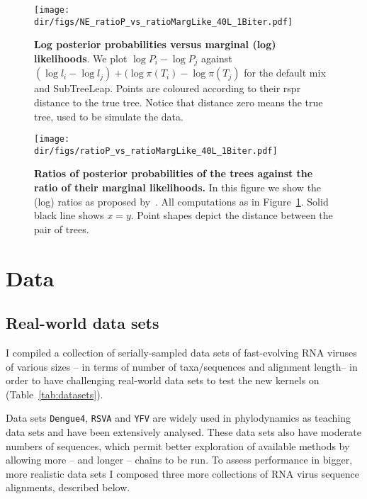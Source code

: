\begin{figure}[!ht]
\centering
\texttt{[image: \\dir/figs/NE\_ratioP\_vs\_ratioMargLike\_40L\_1Biter.pdf]}
\caption[Log posterior probabilities versus marginal (log) likelihoods.]{\textbf{Log posterior probabilities versus marginal (log) likelihoods}.
We plot $\log P_i - \log P_j$ against $(\log l_i - \log l_j) + (\log \pi(T_i) - \log\pi(T_j)$ for the default mix and SubTreeLeap.
Points are coloured according to their rspr distance to the true tree.
Notice that distance zero means the true tree, used to be simulate the data.
}
\label{fig:logP}
\end{figure}
\begin{figure}[!ht]
\centering
\texttt{[image: \\dir/figs/ratioP\_vs\_ratioMargLike\_40L\_1Biter.pdf]}
\caption[Ratios of posterior probabilities of the trees against the ratio of their marginal likelihoods.]{\textbf{Ratios of posterior probabilities of the trees against the ratio of their marginal likelihoods.}
In this figure we show the (log) ratios as proposed by~\cite{Hoehna2008}.
All computations as in Figure~\ref{fig:logP}.
Solid black line shows $x = y$.
Point shapes depict the distance between the pair of trees.
}
\label{fig:ratios}
\end{figure}  

\section{Data}

\subsection{Real-world data sets}
\label{sec:realworld}

I compiled a collection of serially-sampled data sets of fast-evolving RNA viruses of various sizes -- in terms of number of taxa/sequences and  alignment length-- in order to have challenging real-world data sets to test the new kernels on (Table~\ref{tab:datasets}).

Data sets \verb|Dengue4|, \verb|RSVA| and \verb|YFV| are widely used in phylodynamics as teaching data sets and have been extensively analysed.
These data sets also have moderate numbers of sequences, which permit better exploration of available methods by allowing more -- and longer -- chains to be run.
To assess performance in bigger, more realistic data sets I composed three more collections of RNA virus sequence alignments, described below.

